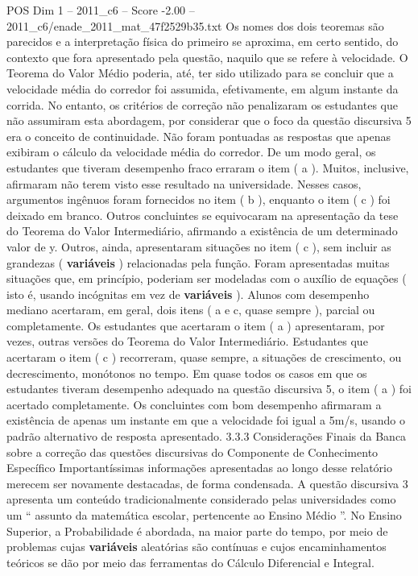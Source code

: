 \begin{textsample}{POS Dim 1 – 2011\_c6 – Score -2.00 – 2011\_c6/enade\_2011\_mat\_47f2529b35.txt}
Os nomes dos dois teoremas são parecidos e a interpretação física do primeiro se aproxima, em certo sentido, do contexto que fora apresentado pela questão, naquilo que se refere à velocidade.
O Teorema do Valor Médio poderia, até, ter sido utilizado para se concluir que a velocidade média do corredor foi assumida, efetivamente, em algum instante da corrida.
No entanto, os critérios de correção não penalizaram os estudantes que não assumiram esta abordagem, por considerar que o foco da questão discursiva 5 era o conceito de continuidade.
Não foram pontuadas as respostas que apenas exibiram o cálculo da velocidade média do corredor.
De um modo geral, os estudantes que tiveram desempenho fraco erraram o item ( a ).
Muitos, inclusive, afirmaram não terem visto esse resultado na universidade.
Nesses casos, argumentos ingênuos foram fornecidos no item ( b ), enquanto o item ( c ) foi deixado em branco.
Outros concluintes se equivocaram na apresentação da tese do Teorema do Valor Intermediário, afirmando a existência de um determinado valor de y.
Outros, ainda, apresentaram situações no item ( c ), sem incluir as grandezas ( \textbf{variáveis} ) relacionadas pela função.
Foram apresentadas muitas situações que, em princípio, poderiam ser modeladas com o auxílio de equações ( isto é, usando incógnitas em vez de \textbf{variáveis} ).
Alunos com desempenho mediano acertaram, em geral, dois itens ( a e c, quase sempre ), parcial ou completamente.
Os estudantes que acertaram o item ( a ) apresentaram, por vezes, outras versões do Teorema do Valor Intermediário.
Estudantes que acertaram o item ( c ) recorreram, quase sempre, a situações de crescimento, ou decrescimento, monótonos no tempo.
Em quase todos os casos em que os estudantes tiveram desempenho adequado na questão discursiva 5, o item ( a ) foi acertado completamente.
Os concluintes com bom desempenho afirmaram a existência de apenas um instante em que a velocidade foi igual a 5m/s, usando o padrão alternativo de resposta apresentado. 3.3.3 Considerações Finais da Banca sobre a correção das questões discursivas do Componente de Conhecimento Específico Importantíssimas informações apresentadas ao longo desse relatório merecem ser novamente destacadas, de forma condensada.
A questão discursiva 3 apresenta um conteúdo tradicionalmente considerado pelas universidades como um “ assunto da matemática escolar, pertencente ao Ensino Médio ”.
No Ensino Superior, a Probabilidade é abordada, na maior parte do tempo, por meio de problemas cujas \textbf{variáveis} aleatórias são contínuas e cujos encaminhamentos teóricos se dão por meio das ferramentas do Cálculo Diferencial e Integral.

\end{textsample}
